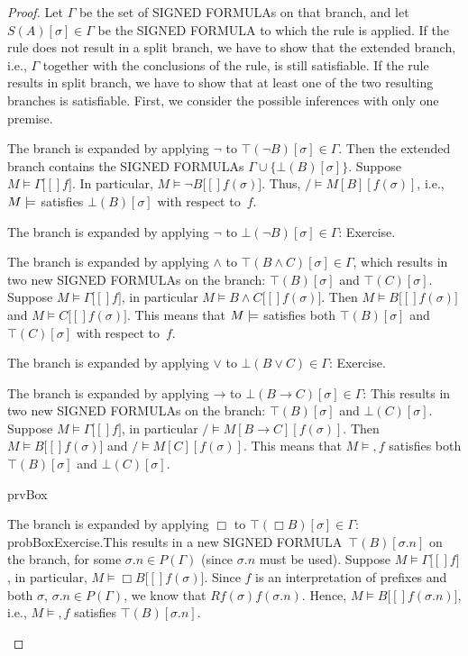 \documentclass[10pt,a4paper]{article}
\newcommand*{\olup}[1]{\MakeUppercase{#1}}
\theoremstyle{plain}
\theoremstyle{definition}
\theoremstyle{remark}
\providecommand{\lif}{\mathbin{\rightarrow}}
\providecommand{\sFmla}[2]{#1(#2)}
\providecommand{\True}{\top}
\providecommand{\False}{\bot}
\providecommand{\mSat}[3]{\ensuremath{#1 \models #2[#3]}}
\providecommand{\mModel}[2]{\ensuremath{#1 \models #2}}
\providecommand{\iftag}[1]{#1}
\providecommand{\TRule}[1]{}
\providecommand{\tagfalse}{\mathrm{F}}
\providecommand{\iftag}{}
\begin{document}
\begin{proof}
Let $\Gamma$ be the set of \olup{signed formula}s on that branch, and let
$\sFmla{S}{A}[\sigma] \in \Gamma$ be the \olup{signed formula} to which
the rule is applied. If the rule does not result in a split branch, we
have to show that the extended branch, i.e., $\Gamma$ together with
the conclusions of the rule, is still satisfiable. If the rule results
in split branch, we have to show that at least one of the two
resulting branches is satisfiable.
\tagfalse{prvDiamond}
First, we consider the possible inferences with only one premise.
\begin{enumerate}
\item The branch is expanded by applying $\TRule{\True}{\lnot}$ to
  $\sFmla{\True}{\lnot B}[\sigma] \in \Gamma$. Then the extended
  branch contains the \olup{signed formula}s $\Gamma \cup
  \{\sFmla{\False}{B}[\sigma]\}$.  Suppose $\mSat{M}{\Gamma}[f]$. In
  particular, $\mSat{M}{\lnot B}[f(\sigma)]$. Thus,
  $\mSat/{M}{B}[f(\sigma)]$, i.e., $\mModel{M}$ satisfies
  $\sFmla{\False}{B}[\sigma]$ with respect to~$f$.
\item The branch is expanded by applying $\TRule{\False}{\lnot}$ to
  $\sFmla{\False}{\lnot B}[\sigma] \in \Gamma$: Exercise.
\item The branch is expanded by applying $\TRule{\True}{\land}$ to
  $\sFmla{\True}{B \land C}[\sigma] \in \Gamma$, which results in
  two new \olup{signed formula}s on the branch:
  $\sFmla{\True}{B}[\sigma]$ and $\sFmla{\True}{C}[\sigma]$. Suppose
  $\mSat{M}{\Gamma}[f]$, in particular $\mSat{M}{B \land
    C}[f(\sigma)]$. Then $\mSat{M}{B}[f(\sigma)]$ and
  $\mSat{M}{C}[f(\sigma)]$. This means that $\mModel{M}$ satisfies
  both $\sFmla{\True}{B}[\sigma]$ and $\sFmla{\True}{C}[\sigma]$
  with respect to~$f$.
\item The branch is expanded by applying $\TRule{\False}{\lor}$ to
  $\sFmla{\False}{B \lor C} \in \Gamma$: Exercise.
\item The branch is expanded by applying $\TRule{\False}{\lif}$ to
  $\sFmla{\False}{B \lif C}[\sigma] \in \Gamma$: This results in two
  new \olup{signed formula}s on the branch: $\sFmla{\True}{B}[\sigma]$ and
  $\sFmla{\False}{C}[\sigma]$. Suppose
  $\mSat{M}{\Gamma}[f]$, in particular
  $\mSat/{M}{B \lif C}[f(\sigma)]$. Then
  $\mSat{M}{B}[f(\sigma)]$ and
  $\mSat/{M}{C}[f(\sigma)]$. This means that
  $\mModel{M}, f$ satisfies both
  $\sFmla{\True}{B}[\sigma]$ and $\sFmla{\False}{C}[\sigma]$.

\iftag{prvBox}{%
\item The branch is expanded by applying $\TRule{\True}{\Box}$ to
  $\sFmla{\True}{\Box B}[\sigma] \in \Gamma$:
  \iftag{probBox}{Exercise.}{This results in a new \olup{signed
      formula}~$\sFmla{\True}{B}[\sigma.n]$ on the branch, for some
    $\sigma.n \in P(\Gamma)$ (since $\sigma.n$ must be used).  Suppose
    $\mSat{M}{\Gamma}[f]$, in particular, $\mSat{M}{\Box
      B}[f(\sigma)]$. Since $f$ is an interpretation of prefixes and
    both $\sigma$, $\sigma.n \in P(\Gamma)$, we know that
    $Rf(\sigma)f(\sigma.n)$.  Hence, $\mSat{M}{B}[f(\sigma.n)]$,
    i.e., $\mModel{M}, f$ satisfies $\sFmla{\True}{B}[\sigma.n]$.}

}
\end{enumerate}
\end{proof}
\end{document}
